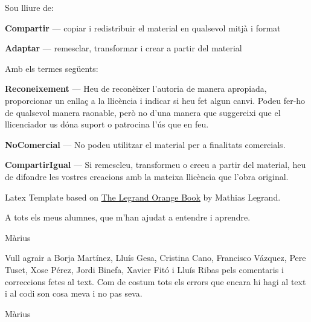 \noindent Sou lliure de:
\begin{description}[leftmargin=\parindent]
 \item {\bf Compartir} — copiar i redistribuir el material en qualsevol mitjà i format
 \item {\bf Adaptar} — remesclar, transformar i crear a partir del material
\end{description}

\noindent Amb els termes següents:
\begin{description}[leftmargin=\parindent]
 \item {\bf Reconeixement} — Heu de reconèixer l'autoria de manera apropiada, proporcionar un enllaç a la llicència i indicar si heu fet algun canvi. Podeu fer-ho de qualsevol manera raonable, però no d'una manera que suggereixi que el llicenciador us dóna suport o patrocina l'ús que en feu.
 \item {\bf NoComercial} — No podeu utilitzar el material per a finalitats comercials.
 \item {\bf CompartirIgual} — Si remescleu, transformeu o creeu a partir del material, heu de difondre les vostres creacions amb la mateixa llicència que l'obra original.
\end{description}

\noindent Latex Template based on \href{https://www.latextemplates.com/template/the-legrand-orange-book}{The Legrand Orange Book} by Mathias Legrand.


\begin{dedication}
 A tots els meus alumnes, que m'han ajudat a entendre i aprendre.
 \par   %
    \vspace{\baselineskip}
    Màrius

    \vspace{4\baselineskip}
    \vspace{4\baselineskip}
    Vull agrair a Borja Martínez, Lluís Gesa, Cristina Cano, Francisco Vázquez, Pere Tuset, Xose Pérez, Jordi Binefa, Xavier Fitó i Lluís Ribas pels comentaris i correccions fetes al text. Com de costum tots els errors que encara hi hagi al text i al codi son cosa meva i no pas seva.
    
    \vspace{\baselineskip}
    Màrius
\end{dedication}


